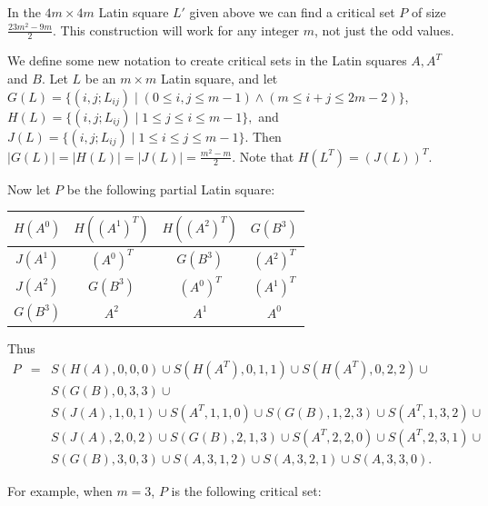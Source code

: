 \documentclass[12pt]{report}
\begin{document}
In the $4m \times 4m$ Latin square $L'$ given above we can find a critical set
$P$ of size $\displaystyle{\frac{23m^2-9m}{2}}$.
This construction will work for any integer $m$, not just the odd values.

We define some new notation to create critical sets 
in the Latin squares $A, A^T$ and $B$.
Let $L$ be an $m \times m$ Latin square, and let 
$G(L) = \{ (i,j;L_{ij}) \mid (0 \leq i,j \leq m-1) \wedge (m \leq i+j \leq 2m-2) \}$, 
$H(L) = \{ (i,j;L_{ij}) \mid 1 \leq j \leq i \leq m-1 \},$ and $J(L) = \{
(i,j;L_{ij}) \mid 1 \leq i \leq j \leq m-1 \}$.   
Then $|G(L)| = |H(L)| =  |J(L)| =
\displaystyle{\frac{m^2-m}{2}}$.  Note that $H(L^T) = (J(L))^T$.

Now let $P$ be the following partial Latin square:

\begin{center}
\begin{tabular}{|c|c|c|c|}
\hline
$H(A^0)$ & $H((A^1)^T)$ & $H((A^2)^T)$ & $G(B^3)$ \\
\hline
$J(A^1)$ & $(A^0)^T$ & $G(B^3)$ & $(A^2)^T$ \\
\hline
$J(A^2)$ & $G(B^3)$ & $(A^0)^T$ & $(A^1)^T$ \\
\hline
$G(B^3)$ & $A^2$ & $A^1$ & $A^0$ \\
\hline
\end{tabular}
\end{center}

Thus 
\begin{eqnarray*}
P &=& S(H(A),0,0,0) \cup S(H(A^T),0,1,1) \cup S(H(A^T),0,2,2) \cup \\
&& S(G(B),0,3,3) \cup \\
&&    S(J(A),1,0,1) \cup S(A^T,1,1,0) \cup S(G(B),1,2,3) \cup S(A^T,1,3,2) \cup \\
&&    S(J(A),2,0,2) \cup S(G(B),2,1,3) \cup S(A^T,2,2,0) \cup S(A^T,2,3,1) \cup \\
&&    S(G(B),3,0,3) \cup S(A,3,1,2) \cup S(A,3,2,1) \cup S(A,3,3,0).
\end{eqnarray*}

For example, when $m = 3$, $P$ is the following critical set:
\end{document}
